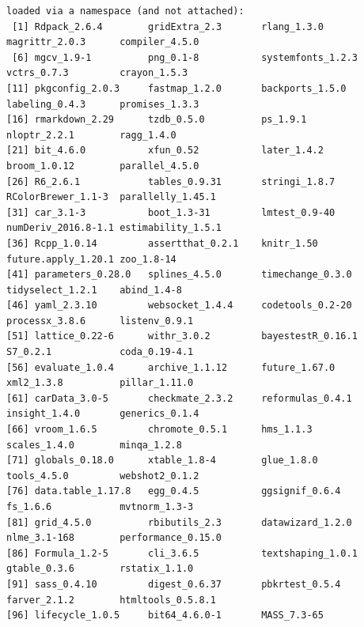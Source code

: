 \documentclass[
  11pt,
  oneside]{article}
\begin{document}
\begin{verbatim}
loaded via a namespace (and not attached):
 [1] Rdpack_2.6.4        gridExtra_2.3       rlang_1.3.0         magrittr_2.0.3      compiler_4.5.0     
 [6] mgcv_1.9-1          png_0.1-8           systemfonts_1.2.3   vctrs_0.7.3         crayon_1.5.3       
[11] pkgconfig_2.0.3     fastmap_1.2.0       backports_1.5.0     labeling_0.4.3      promises_1.3.3     
[16] rmarkdown_2.29      tzdb_0.5.0          ps_1.9.1            nloptr_2.2.1        ragg_1.4.0         
[21] bit_4.6.0           xfun_0.52           later_1.4.2         broom_1.0.12        parallel_4.5.0     
[26] R6_2.6.1            tables_0.9.31       stringi_1.8.7       RColorBrewer_1.1-3  parallelly_1.45.1  
[31] car_3.1-3           boot_1.3-31         lmtest_0.9-40       numDeriv_2016.8-1.1 estimability_1.5.1 
[36] Rcpp_1.0.14         assertthat_0.2.1    knitr_1.50          future.apply_1.20.1 zoo_1.8-14         
[41] parameters_0.28.0   splines_4.5.0       timechange_0.3.0    tidyselect_1.2.1    abind_1.4-8        
[46] yaml_2.3.10         websocket_1.4.4     codetools_0.2-20    processx_3.8.6      listenv_0.9.1      
[51] lattice_0.22-6      withr_3.0.2         bayestestR_0.16.1   S7_0.2.1            coda_0.19-4.1      
[56] evaluate_1.0.4      archive_1.1.12      future_1.67.0       xml2_1.3.8          pillar_1.11.0      
[61] carData_3.0-5       checkmate_2.3.2     reformulas_0.4.1    insight_1.4.0       generics_0.1.4     
[66] vroom_1.6.5         chromote_0.5.1      hms_1.1.3           scales_1.4.0        minqa_1.2.8        
[71] globals_0.18.0      xtable_1.8-4        glue_1.8.0          tools_4.5.0         webshot2_0.1.2     
[76] data.table_1.17.8   egg_0.4.5           ggsignif_0.6.4      fs_1.6.6            mvtnorm_1.3-3      
[81] grid_4.5.0          rbibutils_2.3       datawizard_1.2.0    nlme_3.1-168        performance_0.15.0 
[86] Formula_1.2-5       cli_3.6.5           textshaping_1.0.1   gtable_0.3.6        rstatix_1.1.0      
[91] sass_0.4.10         digest_0.6.37       pbkrtest_0.5.4      farver_2.1.2        htmltools_0.5.8.1  
[96] lifecycle_1.0.5     bit64_4.6.0-1       MASS_7.3-65        
\end{verbatim}
\end{document}
